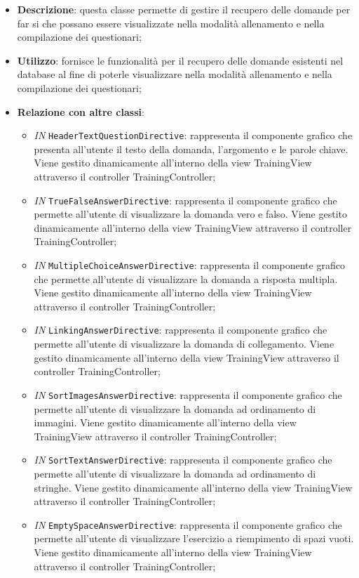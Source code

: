 \begin{itemize}
	\item \textbf{Descrizione}: questa classe permette di gestire il recupero delle domande per far si che possano essere visualizzate nella modalità allenamento e nella compilazione dei questionari;
	\item \textbf{Utilizzo}: fornisce le funzionalità per il recupero delle domande esistenti nel database al fine di poterle visualizzare nella modalità allenamento e nella compilazione dei questionari;
	\item \textbf{Relazione con altre classi}:
	\begin{itemize}
		\item \textit{IN} \texttt{HeaderTextQuestionDirective}: rappresenta il componente grafico che presenta all'utente il testo della domanda, l'argomento e le parole chiave. Viene gestito dinamicamente all'interno della view TrainingView attraverso il controller TrainingController; 
		\item \textit{IN} \texttt{TrueFalseAnswerDirective}: rappresenta il componente grafico che permette all'utente di visualizzare la domanda vero e falso. Viene gestito dinamicamente all'interno della view TrainingView attraverso il controller TrainingController; 
		\item \textit{IN} \texttt{MultipleChoiceAnswerDirective}: rappresenta il componente grafico che permette all'utente di visualizzare la domanda a risposta multipla. Viene gestito dinamicamente all'interno della view TrainingView attraverso il controller TrainingController; 
		\item \textit{IN} \texttt{LinkingAnswerDirective}: rappresenta il componente grafico che permette all'utente di visualizzare la domanda di collegamento. Viene gestito dinamicamente all'interno della view TrainingView attraverso il controller TrainingController; 
		\item \textit{IN} \texttt{SortImagesAnswerDirective}: rappresenta il componente grafico che permette all'utente di visualizzare la domanda ad ordinamento di immagini. Viene gestito dinamicamente all'interno della view TrainingView attraverso il controller TrainingController; 
		\item \textit{IN} \texttt{SortTextAnswerDirective}: rappresenta il componente grafico che permette all'utente di visualizzare la domanda ad ordinamento di stringhe. Viene gestito dinamicamente all'interno della view TrainingView attraverso il controller TrainingController; 
		\item \textit{IN} \texttt{EmptySpaceAnswerDirective}: rappresenta il componente grafico che permette all'utente di visualizzare l'esercizio a riempimento di spazi vuoti. Viene gestito dinamicamente all'interno della view TrainingView attraverso il controller TrainingController; 

\end{itemize}
\end{itemize}
